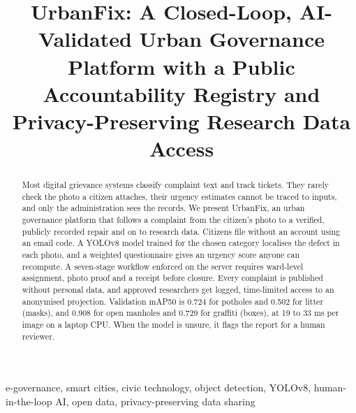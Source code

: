 \documentclass[conference]{IEEEtran}
\begin{document}
\title{UrbanFix: A Closed-Loop, AI-Validated Urban Governance Platform with a Public Accountability Registry and Privacy-Preserving Research Data Access}

\author{
\and
{}
}

\maketitle

\begin{abstract}
Most digital grievance systems classify complaint text and track tickets. They rarely check the photo a citizen attaches, their urgency estimates cannot be traced to inputs, and only the administration sees the records. We present UrbanFix, an urban governance platform that follows a complaint from the citizen's photo to a verified, publicly recorded repair and on to research data. Citizens file without an account using an email code. A YOLOv8 model trained for the chosen category localises the defect in each photo, and a weighted questionnaire gives an urgency score anyone can recompute. A seven-stage workflow enforced on the server requires ward-level assignment, photo proof and a receipt before closure. Every complaint is published without personal data, and approved researchers get logged, time-limited access to an anonymised projection. Validation mAP50 is 0.724 for potholes and 0.502 for litter (masks), and 0.908 for open manholes and 0.729 for graffiti (boxes), at 19 to 33 ms per image on a laptop CPU. When the model is unsure, it flags the report for a human reviewer.
\end{abstract}

\begin{IEEEkeywords}
e-governance, smart cities, civic technology, object detection, YOLOv8, human-in-the-loop AI, open data, privacy-preserving data sharing
\end{IEEEkeywords}
\end{document}
